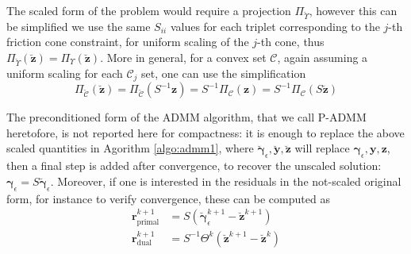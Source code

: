 \documentclass[AMA,STIX1COL]{WileyNJD-v2}
\newcommand{\vect}[1]{\bm{#1}}
\begin{document}
The scaled form of the problem would require a projection $\Pi_{\breve{\Upsilon}}$, however this can be simplified we use the same $S_{ii}$ values for each triplet corresponding to the $j$-th friction cone constraint, for uniform scaling of the $j$-th cone, thus $\Pi_{\breve{\Upsilon}}(\breve{\vect{z}}) = \Pi_{\Upsilon}(\breve{\vect{z}})$. 
More in general, for a convex set $\mathcal{C}$, again assuming a uniform scaling for each $\mathcal{C}_j$ set, one can use the simplification
\[
\Pi_{\breve{\mathcal{C}}}(\breve{\vect{z}}) 
= \Pi_{\breve{\mathcal{C}}}(S^{-1}\vect{z}) 
= S^{-1} \Pi_{\mathcal{C}}(\vect{z}) 
= S^{-1} \Pi_{\mathcal{C}}( S \breve{\vect{z}})
\]

The preconditioned form of the ADMM algorithm, that we call P-ADMM heretofore, is not reported here for compactness: it is enough to replace the above scaled quantities in Agorithm \ref{algo:admm1}, where $\breve{\vect{\gamma}}_\epsilon,\breve{\vect{y}},\breve{\vect{z}}$ will replace $\vect{\gamma}_\epsilon, \vect{y}, \vect{z}$, then a final step is added after convergence, to recover the unscaled solution: $\vect{\gamma}_\epsilon = S \breve{\vect{\gamma}}_\epsilon$. Moreover, if one is interested in the residuals in the not-scaled original form, for instance to verify convergence, these can be computed as 
%
\begin{align}
\vect{r}_{\text{primal}}^{k+1} &= S \left( \breve{\vect{\gamma}}_\epsilon^{k+1}-\breve{\vect{z}}^{k+1} \right) \nonumber \\
\vect{r}_{\text{dual}}^{k+1}   &= S^{-1} \Theta^k (\breve{\vect{z}}^{k+1} - \breve{\vect{z}}^{k}) \nonumber
\end{align}
\end{document}
